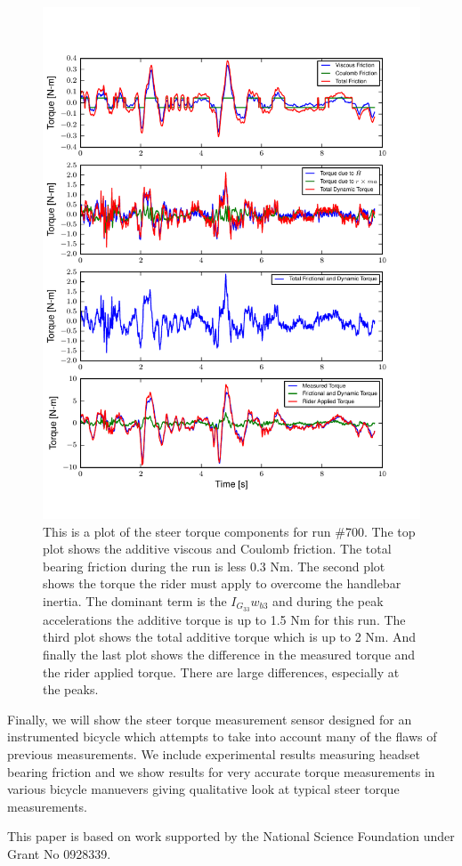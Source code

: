 \documentclass{article}
\begin{document}
\begin{figure}
  \centering
  \includegraphics[width=5.0in]{steer-torque-components.pdf}
  \caption{This is a plot of the steer torque components for run \#700. The top
  plot shows the additive viscous and Coulomb friction. The total bearing
  friction during the run is less 0.3 Nm. The second plot shows the torque the
  rider must apply to overcome the handlebar inertia. The dominant term is the
  $I_{G_{33}} w_{b3}$ and during the peak accelerations the additive torque is
  up to 1.5 Nm for this run. The third plot shows the total additive torque
  which is up to 2 Nm. And finally the last plot shows the difference in the
  measured torque and the rider applied torque. There are large differences,
  especially at the peaks.}
\end{figure}

Finally, we will show the steer torque measurement sensor designed for an
instrumented bicycle which attempts to take into account many of the flaws of
previous measurements. We include experimental results measuring headset
bearing friction and we show results for very accurate torque measurements in
various bicycle manuevers giving qualitative look at typical steer torque
measurements.

This paper is based on work supported by the National Science Foundation under
Grant No 0928339.



\end{document}
